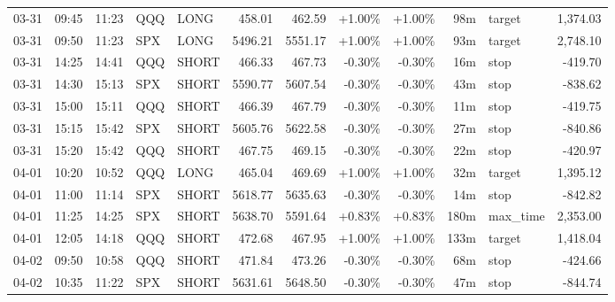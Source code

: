 \documentclass[11pt,a4paper,twoside]{article}
\begin{document}
\begin{center}
\begin{longtable}{>{\color{txtmain}}l l l l l r r r r r >{\color{txtmain}}l r}
03-31 & 09:45 & 11:23 & QQQ & LONG & 458.01 & 462.59 & \textcolor{wingreen}{+1.00\%} & \textcolor{wingreen}{+1.00\%} & 98m & target & \textcolor{wingreen}{1,374.03} \\
03-31 & 09:50 & 11:23 & SPX & LONG & 5496.21 & 5551.17 & \textcolor{wingreen}{+1.00\%} & \textcolor{wingreen}{+1.00\%} & 93m & target & \textcolor{wingreen}{2,748.10} \\
03-31 & 14:25 & 14:41 & QQQ & SHORT & 466.33 & 467.73 & \textcolor{lossred}{-0.30\%} & \textcolor{lossred}{-0.30\%} & 16m & stop & \textcolor{lossred}{-419.70} \\
03-31 & 14:30 & 15:13 & SPX & SHORT & 5590.77 & 5607.54 & \textcolor{lossred}{-0.30\%} & \textcolor{lossred}{-0.30\%} & 43m & stop & \textcolor{lossred}{-838.62} \\
03-31 & 15:00 & 15:11 & QQQ & SHORT & 466.39 & 467.79 & \textcolor{lossred}{-0.30\%} & \textcolor{lossred}{-0.30\%} & 11m & stop & \textcolor{lossred}{-419.75} \\
03-31 & 15:15 & 15:42 & SPX & SHORT & 5605.76 & 5622.58 & \textcolor{lossred}{-0.30\%} & \textcolor{lossred}{-0.30\%} & 27m & stop & \textcolor{lossred}{-840.86} \\
03-31 & 15:20 & 15:42 & QQQ & SHORT & 467.75 & 469.15 & \textcolor{lossred}{-0.30\%} & \textcolor{lossred}{-0.30\%} & 22m & stop & \textcolor{lossred}{-420.97} \\
04-01 & 10:20 & 10:52 & QQQ & LONG & 465.04 & 469.69 & \textcolor{wingreen}{+1.00\%} & \textcolor{wingreen}{+1.00\%} & 32m & target & \textcolor{wingreen}{1,395.12} \\
04-01 & 11:00 & 11:14 & SPX & SHORT & 5618.77 & 5635.63 & \textcolor{lossred}{-0.30\%} & \textcolor{lossred}{-0.30\%} & 14m & stop & \textcolor{lossred}{-842.82} \\
04-01 & 11:25 & 14:25 & SPX & SHORT & 5638.70 & 5591.64 & \textcolor{wingreen}{+0.83\%} & \textcolor{wingreen}{+0.83\%} & 180m & max\_time & \textcolor{wingreen}{2,353.00} \\
04-01 & 12:05 & 14:18 & QQQ & SHORT & 472.68 & 467.95 & \textcolor{wingreen}{+1.00\%} & \textcolor{wingreen}{+1.00\%} & 133m & target & \textcolor{wingreen}{1,418.04} \\
04-02 & 09:50 & 10:58 & QQQ & SHORT & 471.84 & 473.26 & \textcolor{lossred}{-0.30\%} & \textcolor{lossred}{-0.30\%} & 68m & stop & \textcolor{lossred}{-424.66} \\
04-02 & 10:35 & 11:22 & SPX & SHORT & 5631.61 & 5648.50 & \textcolor{lossred}{-0.30\%} & \textcolor{lossred}{-0.30\%} & 47m & stop & \textcolor{lossred}{-844.74} \\

\end{longtable}
\end{center}
\end{document}
